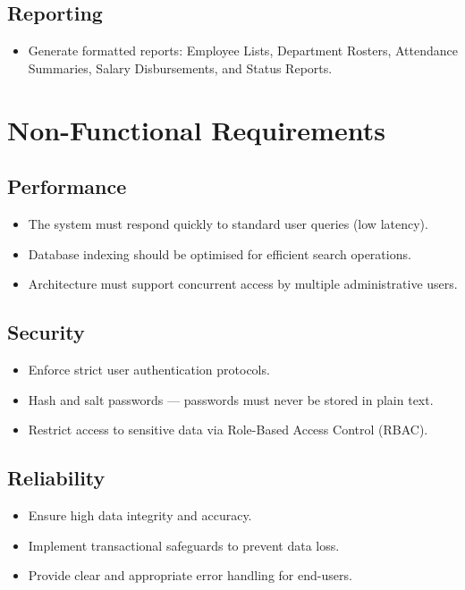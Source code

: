 \documentclass[12pt,a4paper]{report}
\begin{document}
\subsection{Reporting}
\begin{itemize}
  \item Generate formatted reports: Employee Lists, Department Rosters, Attendance Summaries, Salary Disbursements, and Status Reports.
\end{itemize}

\section{Non-Functional Requirements}

\subsection{Performance}
\begin{itemize}
  \item The system must respond quickly to standard user queries (low latency).
  \item Database indexing should be optimised for efficient search operations.
  \item Architecture must support concurrent access by multiple administrative users.
\end{itemize}

\subsection{Security}
\begin{itemize}
  \item Enforce strict user authentication protocols.
  \item Hash and salt passwords --- passwords must never be stored in plain text.
  \item Restrict access to sensitive data via Role-Based Access Control (RBAC).
\end{itemize}

\subsection{Reliability}
\begin{itemize}
  \item Ensure high data integrity and accuracy.
  \item Implement transactional safeguards to prevent data loss.
  \item Provide clear and appropriate error handling for end-users.
\end{itemize}
\end{document}
